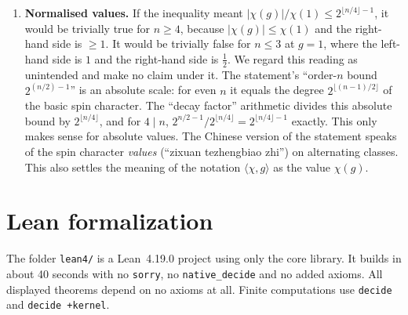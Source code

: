 \documentclass[11pt]{article}
\theoremstyle{remark}
\begin{document}
\begin{enumerate}
  ($|\chi(g)|^2\le|C_G(g)|$). This makes the bound $2^{\lfloor n/4\rfloor-1}$ and the comparison
  with ``the order-$n$ bound $2^{(n/2)-1}$'' meaningless, so we regard it as unintended. We make
  no claim under this reading.
\item \textbf{Normalised values.} If the inequality meant $|\chi(g)|/\chi(1)\le2^{\lfloor n/4\rfloor-1}$,
  it would be trivially true for $n\ge4$, because $|\chi(g)|\le\chi(1)$ and the right-hand side is
  $\ge1$. It would be trivially false for $n\le3$ at $g=1$, where the left-hand side is $1$ and the
  right-hand side is $\tfrac12$. We regard this reading as unintended and make no claim under it.
  The statement's ``order-$n$ bound $2^{(n/2)-1}$'' is an absolute scale: for even $n$ it equals the
  degree $2^{\lfloor(n-1)/2\rfloor}$ of the basic spin character. The ``decay factor'' arithmetic
  divides this absolute bound by $2^{\lfloor n/4\rfloor}$, and for $4\mid n$,
  $2^{n/2-1}/2^{\lfloor n/4\rfloor}=2^{\lfloor n/4\rfloor-1}$ exactly. This only makes sense for
  absolute values. The Chinese version of the statement speaks of the spin character
  \emph{values} (``zixuan tezhengbiao zhi'') on alternating classes. This also settles the
  meaning of the notation $\langle\chi,g\rangle$ as the value $\chi(g)$.
\end{enumerate}

\section{Lean formalization}\label{sec:lean}
The folder \texttt{lean4/} is a Lean~4.19.0 project using only the core library. It builds in
about 40 seconds with no \texttt{sorry}, no \texttt{native\_decide} and no added axioms. All
displayed theorems depend on no axioms at all. Finite computations use \texttt{decide} and
\texttt{decide +kernel}.
\end{document}
